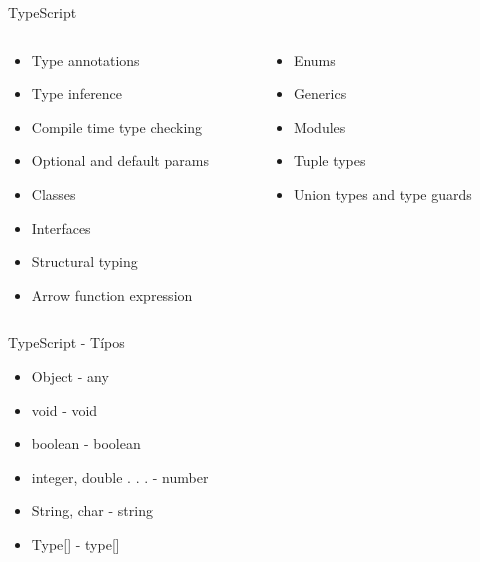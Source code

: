 \documentclass[aspectratio=169]{beamer}
\begin{document}
\begin{frame}{TypeScript}
\begin{columns}
	\begin{column}{0.5\textwidth}
		\begin{itemize}
			\item Type annotations
			\item Type inference
			\item Compile time type checking
			\item Optional and default params
			\item Classes
			\item Interfaces
			\item Structural typing
			\item Arrow function expression
		\end{itemize}
	\end{column}
	\begin{column}{0.5\textwidth}  %
		\begin{itemize}
			\item Enums
			\item Generics
			\item Modules
			\item Tuple types
			\item Union types and type guards
		\end{itemize}
	\end{column}
\end{columns}
\end{frame}

\begin{frame}{TypeScript - Típos}
		\begin{itemize}
			\item Object - any
			\item void - void
			\item boolean - boolean
			\item integer, double . . . - number
			\item String, char - string
			\item Type[] - type[]
		\end{itemize}
\end{frame}
\end{document}
